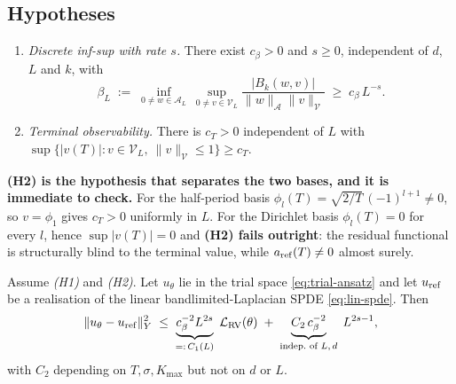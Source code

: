 \subsection{Hypotheses}

\begin{enumerate}
\item[\textbf{(H1)}] \emph{Discrete inf-sup with rate $s$.} There exist
  $c_\beta > 0$ and $s \ge 0$, independent of $d$, $L$ and $k$, with
  \[
    \beta_L \;:=\; \inf_{0 \ne w \in \mathcal{A}_L} \ \sup_{0 \ne v \in \mathcal{V}_L}
      \frac{|B_k(w, v)|}{\|w\|_{\mathcal{A}} \|v\|_{\mathcal{V}}}
      \;\ge\; c_\beta \, L^{-s}.
  \]
\item[\textbf{(H2)}] \emph{Terminal observability.} There is $c_T > 0$
  independent of $L$ with
  $\sup\{|v(T)| : v \in \mathcal{V}_L,\ \|v\|_{\mathcal{V}} \le 1\} \ge c_T$.
\end{enumerate}

\noindent \textbf{(H2) is the hypothesis that separates the two bases, and it is
immediate to check.} For the half-period basis
$\phi_l(T) = \sqrt{2/T}\,(-1)^{l+1} \neq 0$, so $v = \phi_1$ gives
$c_T > 0$ uniformly in $L$. For the Dirichlet basis $\phi_l(T) = 0$ for every
$l$, hence $\sup |v(T)| = 0$ and \textbf{(H2) fails outright}: the residual
functional is structurally blind to the terminal value, while
$a_{\rm ref}(T) \neq 0$ almost surely.

\begin{theorem}
\label{thm:main-v3}
Assume \emph{(H1)} and \emph{(H2)}. Let $u_\theta$ lie in the trial space
\eqref{eq:trial-ansatz} and let $u_{\rm ref}$ be a realisation of the linear
bandlimited-Laplacian SPDE \eqref{eq:lin-spde}. Then
\begin{equation}
  \|u_\theta - u_{\rm ref}\|_Y^2
  \;\le\;
  \underbrace{c_\beta^{-2} L^{2s}}_{=: \,C_1(L)} \;\mathcal{L}_{\rm RV}(\theta)
  \;+\;
  \underbrace{C_2\,c_\beta^{-2}}_{\text{indep.\ of } L,\, d} \; L^{2s - 1},
  \label{eq:thm-bound-v3}
\end{equation}
with $C_2$ depending on $T, \sigma, K_{\max}$ but not on $d$ or $L$.
\end{theorem}

